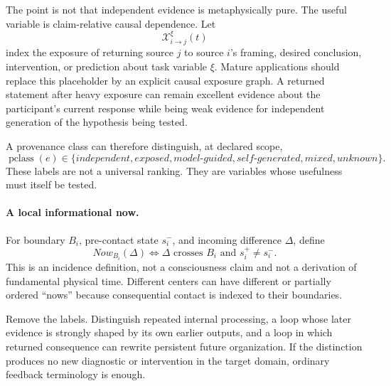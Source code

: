 The point is not that independent evidence is metaphysically pure. The useful variable is claim-relative causal dependence. Let
\begin{equation}
\mathcal X^{\xi}_{i\rightarrow j}(t)
\label{eq:deep-exposure}
\end{equation}
index the exposure of returning source $j$ to source $i$'s framing, desired conclusion, intervention, or prediction about task variable $\xi$. Mature applications should replace this placeholder by an explicit causal exposure graph. A returned statement after heavy exposure can remain excellent evidence about the participant's current response while being weak evidence for independent generation of the hypothesis being tested.

A provenance class can therefore distinguish, at declared scope,
\begin{equation}
\operatorname{pclass}(e)\in
\{independent,exposed,model\!\text{-}guided,self\!\text{-}generated,mixed,unknown\}.
\label{eq:deep-pclass}
\end{equation}
These labels are not a universal ranking. They are variables whose usefulness must itself be tested.

\paragraph{A local informational now.}
For boundary $B_i$, pre-contact state $s_i^-$, and incoming difference $\Delta$, define
\begin{equation}
Now_{B_i}(\Delta)
\Longleftrightarrow
\Delta\text{ crosses }B_i\text{ and }s_i^+\neq s_i^-.
\label{eq:deep-now}
\end{equation}
This is an incidence definition, not a consciousness claim and not a derivation of fundamental physical time. Different centers can have different or partially ordered ``nows'' because consequential contact is indexed to their boundaries.

\begin{readercheck}
Remove the labels. Distinguish repeated internal processing, a loop whose later evidence is strongly shaped by its own earlier outputs, and a loop in which returned consequence can rewrite persistent future organization. If the distinction produces no new diagnostic or intervention in the target domain, ordinary feedback terminology is enough.
\end{readercheck}
